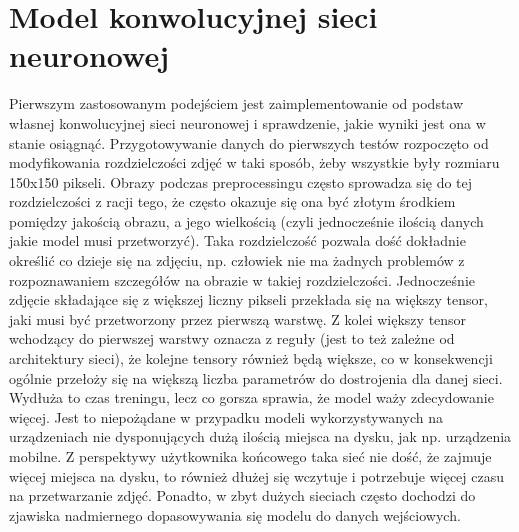 \section{Model konwolucyjnej sieci neuronowej}
Pierwszym zastosowanym podejściem jest zaimplementowanie od podstaw własnej konwolucyjnej sieci neuronowej i sprawdzenie, jakie wyniki jest ona w stanie osiągnąć. Przygotowywanie danych do pierwszych testów rozpoczęto od modyfikowania rozdzielczości zdjęć w taki sposób, żeby wszystkie były rozmiaru 150x150 pikseli. Obrazy podczas preprocessingu często sprowadza się do tej rozdzielczości z racji tego, że często okazuje się ona być złotym środkiem pomiędzy jakością obrazu, a jego wielkością (czyli jednocześnie ilością danych jakie model musi przetworzyć). Taka rozdzielczość pozwala dość dokładnie określić co dzieje się na zdjęciu, np. człowiek nie ma żadnych problemów z rozpoznawaniem szczegółów na obrazie w takiej rozdzielczości. Jednocześnie zdjęcie składające się z większej liczny pikseli przekłada się na większy tensor, jaki musi być przetworzony przez pierwszą warstwę. Z kolei większy tensor wchodzący do pierwszej warstwy oznacza z reguły (jest to też zależne od architektury sieci), że kolejne tensory również będą większe, co w konsekwencji ogólnie przełoży się na większą liczba parametrów do dostrojenia dla danej sieci. Wydłuża to czas treningu, lecz co gorsza sprawia, że model waży zdecydowanie więcej. Jest to niepożądane w przypadku modeli wykorzystywanych na urządzeniach nie dysponujących dużą ilością miejsca na dysku, jak np. urządzenia mobilne. Z perspektywy użytkownika końcowego taka sieć nie dość, że zajmuje więcej miejsca na dysku, to również dłużej się wczytuje i potrzebuje więcej czasu na przetwarzanie zdjęć. Ponadto, w zbyt dużych sieciach często dochodzi do zjawiska nadmiernego dopasowywania się modelu do danych wejściowych.

